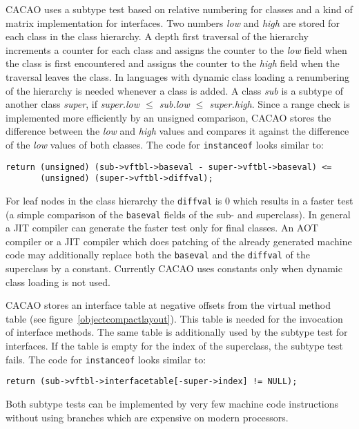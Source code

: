 CACAO uses a subtype test based on relative numbering for classes and a
kind of matrix implementation for interfaces. Two numbers {\em low} and
{\em high} are stored for each class in the class hierarchy. A depth first
traversal of the hierarchy increments a counter for each class and assigns
the counter to the {\em low} field when the class is first encountered and
assigns the counter to the {\em high} field when the traversal leaves the
class. In languages with dynamic class loading a renumbering of the
hierarchy is needed whenever a class is added. A class {\em sub} is a
subtype of another class {\em super}, if {\em super.low $\le$ sub.low $\le$
super.high}. Since a range check is implemented more efficiently by an
unsigned comparison, CACAO stores the difference between the {\em low} and
{\em high} values and compares it against the difference of the {\em low}
values of both classes. The code for {\tt instanceof} looks similar to:

\begin{verbatim}
return (unsigned) (sub->vftbl->baseval - super->vftbl->baseval) <=
       (unsigned) (super->vftbl->diffval);
\end{verbatim}

For leaf nodes in the class hierarchy the {\tt diffval} is 0 which results
in a faster test (a simple comparison of the {\tt baseval} fields of the
sub- and superclass). In general a JIT compiler can generate the faster
test only for final classes. An AOT compiler or a JIT compiler which does
patching of the already generated machine code may additionally replace
both the {\tt baseval} and the {\tt diffval} of the superclass by a
constant. Currently CACAO uses constants only when dynamic class loading is
not used.

CACAO stores an interface table at negative offsets from the virtual method
table (see figure~\ref{objectcompactlayout}). This table is needed for the
invocation of interface methods. The same table is additionally used by the
subtype test for interfaces. If the table is empty for the index of the
superclass, the subtype test fails. The code for {\tt instanceof} looks
similar to:

\begin{verbatim}
return (sub->vftbl->interfacetable[-super->index] != NULL);
\end{verbatim}

Both subtype tests can be implemented by very few machine code instructions
without using branches which are expensive on modern processors.


